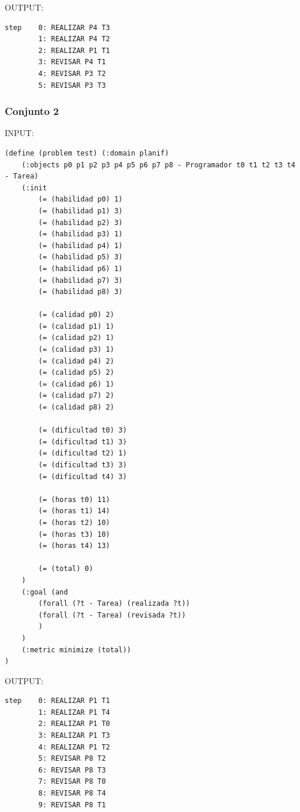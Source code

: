 \documentclass[12pt, titlepage]{article}
\begin{document}
OUTPUT:
\begin{lstlisting}
step    0: REALIZAR P4 T3
        1: REALIZAR P4 T2
        2: REALIZAR P1 T1
        3: REVISAR P4 T1
        4: REVISAR P3 T2
        5: REVISAR P3 T3
\end{lstlisting}

\subsubsection*{Conjunto 2}
INPUT:
\begin{lstlisting}[language=PDDL]
(define (problem test) (:domain planif)
	(:objects p0 p1 p2 p3 p4 p5 p6 p7 p8 - Programador t0 t1 t2 t3 t4 - Tarea)
	(:init
		(= (habilidad p0) 1)
		(= (habilidad p1) 3)
		(= (habilidad p2) 3)
		(= (habilidad p3) 1)
		(= (habilidad p4) 1)
		(= (habilidad p5) 3)
		(= (habilidad p6) 1)
		(= (habilidad p7) 3)
		(= (habilidad p8) 3)
		
		(= (calidad p0) 2)
		(= (calidad p1) 1)
		(= (calidad p2) 1)
		(= (calidad p3) 1)
		(= (calidad p4) 2)
		(= (calidad p5) 2)
		(= (calidad p6) 1)
		(= (calidad p7) 2)
		(= (calidad p8) 2)
		
		(= (dificultad t0) 3)
		(= (dificultad t1) 3)
		(= (dificultad t2) 1)
		(= (dificultad t3) 3)
		(= (dificultad t4) 3)
		
		(= (horas t0) 11)
		(= (horas t1) 14)
		(= (horas t2) 10)
		(= (horas t3) 10)
		(= (horas t4) 13)
		
		(= (total) 0)
	)
	(:goal (and
		(forall (?t - Tarea) (realizada ?t))
		(forall (?t - Tarea) (revisada ?t))
		)
	)
	(:metric minimize (total))
)
\end{lstlisting}

OUTPUT:
\begin{lstlisting}
step    0: REALIZAR P1 T1
        1: REALIZAR P1 T4
        2: REALIZAR P1 T0
        3: REALIZAR P1 T3
        4: REALIZAR P1 T2
        5: REVISAR P8 T2
        6: REVISAR P8 T3
        7: REVISAR P8 T0
        8: REVISAR P8 T4
        9: REVISAR P8 T1
\end{lstlisting}
\end{document}
